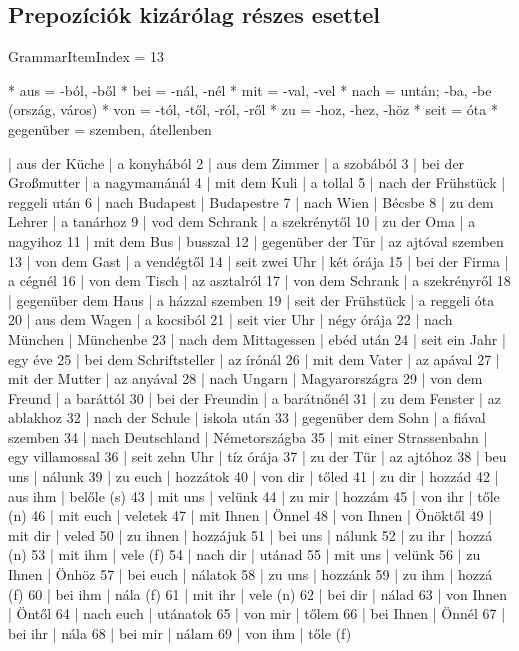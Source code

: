 \documentclass{article}
\newenvironment{desc}{\verbatim}{\endverbatim}
\newenvironment{exmp}{\verbatim}{\endverbatim}
\begin{document}
\subsection{Prepozíciók kizárólag részes esettel}

GrammarItemIndex = 13

\begin{desc}
* aus = -ból, -ből
* bei = -nál, -nél
* mit = -val, -vel
* nach = untán; -ba, -be (ország, város)
* von = -tól, -től, -ról, -ről
* zu = -hoz, -hez, -höz
* seit = óta
* gegenüber = szemben, átellenben
\end{desc}

\begin{exmp}
1 | aus der Küche | a konyhából
2 | aus dem Zimmer | a szobából
3 | bei der Großmutter | a nagymamánál
4 | mit dem Kuli | a tollal
5 | nach der Frühstück | reggeli után
6 | nach Budapest | Budapestre
7 | nach Wien | Bécsbe
8 | zu dem Lehrer | a tanárhoz
9 | vod dem Schrank | a szekrénytől
10 | zu der Oma | a nagyihoz
11 | mit dem Bus | busszal
12 | gegenüber der Tür | az ajtóval szemben
13 | von dem Gast | a vendégtől
14 | seit zwei Uhr | két órája
15 | bei der Firma | a cégnél
16 | von dem Tisch | az asztalról
17 | von dem Schrank | a szekrényről
18 | gegenüber dem Haus | a házzal szemben
19 | seit der Frühstück | a reggeli óta
20 | aus dem Wagen | a kocsiból
21 | seit vier Uhr | négy órája
22 | nach München | Münchenbe
23 | nach dem Mittagessen | ebéd után
24 | seit ein Jahr | egy éve
25 | bei dem Schriftsteller | az írónál
26 | mit dem Vater | az apával
27 | mit der Mutter | az anyával
28 | nach Ungarn | Magyarországra
29 | von dem Freund | a baráttól
30 | bei der Freundin | a barátnőnél
31 | zu dem Fenster | az ablakhoz
32 | nach der Schule | iskola után
33 | gegenüber dem Sohn | a fiával szemben
34 | nach Deutschland | Németországba
35 | mit einer Strassenbahn | egy villamossal
36 | seit zehn Uhr | tíz órája
37 | zu der Tür | az ajtóhoz
38 | beu uns | nálunk
39 | zu euch | hozzátok
40 | von dir | tőled
41 | zu dir | hozzád
42 | aus ihm | belőle (s)
43 | mit uns | velünk
44 | zu mir | hozzám
45 | von ihr | tőle (n)
46 | mit euch | veletek
47 | mit Ihnen | Önnel
48 | von Ihnen | Önöktől
49 | mit dir | veled
50 | zu ihnen | hozzájuk
51 | bei uns | nálunk
52 | zu ihr | hozzá (n)
53 | mit ihm | vele (f)
54 | nach dir | utánad
55 | mit uns | velünk
56 | zu Ihnen | Önhöz
57 | bei euch | nálatok
58 | zu uns | hozzánk
59 | zu ihm | hozzá (f)
60 | bei ihm | nála (f)
61 | mit ihr | vele (n)
62 | bei dir | nálad
63 | von Ihnen | Öntől
64 | nach euch | utánatok
65 | von mir | tőlem
66 | bei Ihnen | Önnél
67 | bei ihr | nála
68 | bei mir | nálam
69 | von ihm | tőle (f)
\end{exmp}
\end{document}
